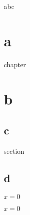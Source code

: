 %
abc
\chapter{a}
chapter

\chapter{b}
\section{c}
section

\section{d}
$x=0$

\begin{theorem}
    $x=0$
\end{theorem}